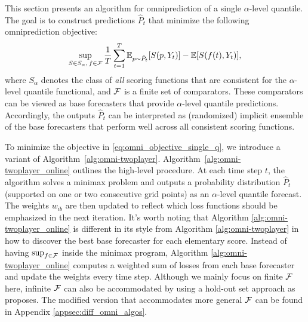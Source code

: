 

This section presents an algorithm for omniprediction of a single $\alpha$-level quantile. The goal is to construct predictions $\hat{P}_t$ that minimize the following omniprediction objective:
\begin{align}\label{eq:omni_objective_single_q}
  \sup_{S \in S_\alpha,\, f \in \mathcal{F}} \frac{1}{T} \sum_{t=1}^T \mathbb{E}_{p \sim \hat{P}_t} [S(p, Y_t)] - \mathbb{E}[S(f(t), Y_t)],
\end{align}
where $S_\alpha$ denotes the class of \textit{all} scoring functions that are consistent for the $\alpha$-level quantile functional, and $\mathcal{F}$ is a finite set of comparators. These comparators can be viewed as base forecasters that provide $\alpha$-level quantile predictions. Accordingly, the outputs $\hat{P}_t$ can be interpreted as (randomized) implicit ensemble of the base forecasters that perform well across all consistent scoring functions. \smallskip

To minimize the objective in \eqref{eq:omni_objective_single_q}, we introduce a variant of Algorithm~\ref{alg:omni-twoplayer}. Algorithm~\ref{alg:omni-twoplayer_online} outlines the high-level procedure. At each time step $t$, the algorithm solves a minimax problem and outputs a probability distribution $\hat{P}_t$ (supported on one or two consecutive grid points) as an $\alpha$-level quantile forecast. The weights $w_{ib}$ are then updated to reflect which loss functions should be emphasized in the next iteration. It's worth noting that Algorithm \ref{alg:omni-twoplayer_online} is different in its style from Algorithm \ref{alg:omni-twoplayer} in how to discover the best base forecaster for each elementary score. Instead of having $\sup_{f\in \mathcal{F}}$ inside the minimax program, Algorithm \ref{alg:omni-twoplayer_online} computes a weighted sum of losses from each base forecaster and update the weights every time step. Although we mainly focus on finite $\mathcal{F}$ here, infinite $\mathcal{F}$ can also be accommodated by using a hold-out set approach as \cite{isaac2025omni} proposes. The modified version that accommodates more general $\mathcal{F}$ can be found in Appendix \ref{appsec:diff_omni_algos}. \smallskip

